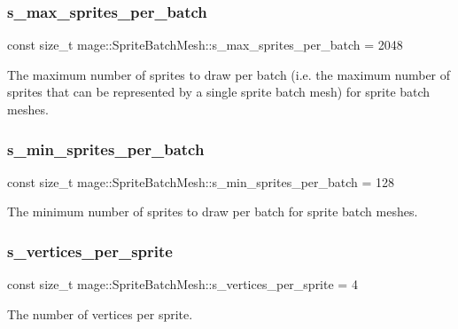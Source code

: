 \subsubsection{\texorpdfstring{s\+\_\+max\+\_\+sprites\+\_\+per\+\_\+batch}{s\_max\_sprites\_per\_batch}}
{\footnotesize\ttfamily const size\+\_\+t mage\+::\+Sprite\+Batch\+Mesh\+::s\+\_\+max\+\_\+sprites\+\_\+per\+\_\+batch = 2048\hspace{0.3cm}{\ttfamily [static]}}

The maximum number of sprites to draw per batch (i.\+e. the maximum number of sprites that can be represented by a single sprite batch mesh) for sprite batch meshes. \hypertarget{classmage_1_1_sprite_batch_mesh_accc52fa93a3c7d42e2d4db54c1211d5d}{}\label{classmage_1_1_sprite_batch_mesh_accc52fa93a3c7d42e2d4db54c1211d5d} 
\subsubsection{\texorpdfstring{s\+\_\+min\+\_\+sprites\+\_\+per\+\_\+batch}{s\_min\_sprites\_per\_batch}}
{\footnotesize\ttfamily const size\+\_\+t mage\+::\+Sprite\+Batch\+Mesh\+::s\+\_\+min\+\_\+sprites\+\_\+per\+\_\+batch = 128\hspace{0.3cm}{\ttfamily [static]}}

The minimum number of sprites to draw per batch for sprite batch meshes. \hypertarget{classmage_1_1_sprite_batch_mesh_a089a9cf9b57f43274bb2542b3c30dd55}{}\label{classmage_1_1_sprite_batch_mesh_a089a9cf9b57f43274bb2542b3c30dd55} 
\subsubsection{\texorpdfstring{s\+\_\+vertices\+\_\+per\+\_\+sprite}{s\_vertices\_per\_sprite}}
{\footnotesize\ttfamily const size\+\_\+t mage\+::\+Sprite\+Batch\+Mesh\+::s\+\_\+vertices\+\_\+per\+\_\+sprite = 4\hspace{0.3cm}{\ttfamily [static]}}

The number of vertices per sprite. 
